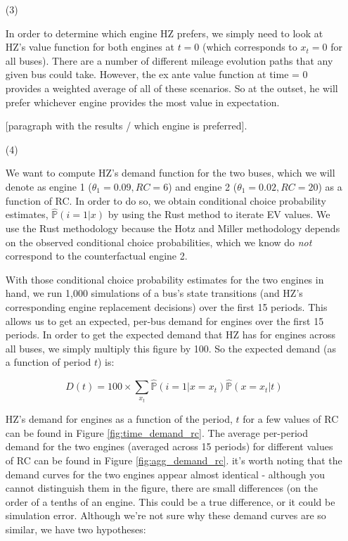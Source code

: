 \documentclass[paper=a4, fontsize=11pt]{scrartcl} %
\numberwithin{equation}{section} %
\numberwithin{figure}{section} %
\numberwithin{table}{section} %
\begin{document}
\begin{itemize}
\begin{itemize}
\item[(3)]

In order to determine which engine HZ prefers, we simply need to look at HZ's value function for both engines at $t=0$ (which corresponds to $x_t = 0$ for all buses). There are a number of different mileage evolution paths that any given bus could take. However, the ex ante value function at time = 0 provides a weighted average of all of these scenarios. So at the outset, he will prefer whichever engine provides the most value in expectation.

[paragraph with the results / which engine is preferred].

\item[(4)]

We want to compute HZ's demand function for the two buses, which we will denote as engine 1 ($\theta_1 = 0.09, RC = 6$) and engine 2 ($\theta_1 = 0.02, RC = 20$) as a function of RC. In order to do so, we obtain conditional choice probability estimates, $\hat{\mathbb{P}}(i = 1 | x)$ by using the Rust method to iterate EV values. We use the Rust methodology because the Hotz and Miller methodology depends on the observed conditional choice probabilities, which we know do \textit{not} correspond to the counterfactual engine 2.

With those conditional choice probability estimates for the two engines in hand, we run 1,000 simulations of a bus's state transitions (and HZ's corresponding engine replacement decisions) over the first 15 periods. This allows us to get an expected, per-bus demand for engines over the first 15 periods. In order to get the expected demand that HZ has for engines across all buses, we simply multiply this figure by 100. So the expected demand (as a function of period $t$) is:

\begin{equation}
D(t) = 100 \times \sum_{x_t} \hat{\mathbb{P}}(i = 1 | x = x_t) \hat{\mathbb{P}}(x = x_t | t)
\end{equation}

HZ's demand for engines as a function of the period, $t$ for a few values of RC can be found in Figure \ref{fig:time_demand_rc}. The average per-period demand for the two engines (averaged across 15 periods) for different values of RC can be found in Figure \ref{fig:agg_demand_rc}. it's worth noting that the demand curves for the two engines appear almost identical - although you cannot distinguish them in the figure, there are small differences (on the order of a tenths of an engine. This could be a true difference, or it could be simulation error. Although we're not sure why these demand curves are so similar, we have two hypotheses:


\end{itemize}
\end{itemize}
\end{document}
